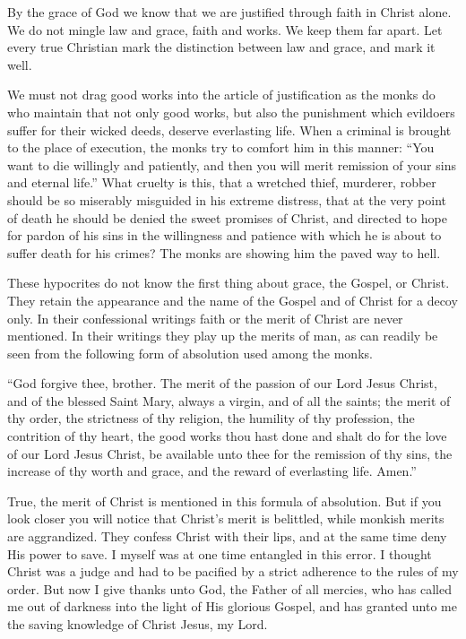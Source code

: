 By the grace of God we know that we are justified through faith in Christ alone. We do not mingle law and grace, faith and works. We keep them far apart. Let every true Christian mark the distinction between law and grace, and mark it well.

We must not drag good works into the article of justification as the monks do who maintain that not only good works, but also the punishment which evildoers suffer for their wicked deeds, deserve everlasting life. When a criminal is brought to the place of execution, the monks try to comfort him in this manner: “You want to die willingly and patiently, and then you will merit remission of your sins and eternal life.” What cruelty is this, that a wretched thief, murderer, robber should be so miserably misguided in his extreme distress, that at the very point of death he should be denied the sweet promises of Christ, and directed to hope for pardon of his sins in the willingness and patience with which he is about to suffer death for his crimes? The monks are showing him the paved way to hell.

These hypocrites do not know the first thing about grace, the Gospel, or Christ. They retain the appearance and the name of the Gospel and of Christ for a decoy only. In their confessional writings faith or the merit of Christ are never mentioned. In their writings they play up the merits of man, as can readily be seen from the following form of absolution used among the monks.

“God forgive thee, brother. The merit of the passion of our Lord Jesus Christ, and of the blessed Saint Mary, always a virgin, and of all the saints; the merit of thy order, the strictness of thy religion, the humility of thy profession, the contrition of thy heart, the good works thou hast done and shalt do for the love of our Lord Jesus Christ, be available unto thee for the remission of thy sins, the increase of thy worth and grace, and the reward of everlasting life. Amen.”

True, the merit of Christ is mentioned in this formula of absolution. But if you look closer you will notice that Christ’s merit is belittled, while monkish merits are aggrandized. They confess Christ with their lips, and at the same time deny His power to save. I myself was at one time entangled in this error. I thought Christ was a judge and had to be pacified by a strict adherence to the rules of my order. But now I give thanks unto God, the Father of all mercies, who has called me out of darkness into the light of His glorious Gospel, and has granted unto me the saving knowledge of Christ Jesus, my Lord.

